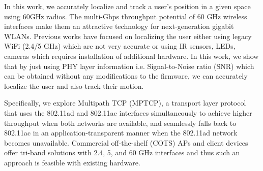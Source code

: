In this work, we accurately localize and track a user's position in 
a given space using 60GHz radios.
The multi-Gbps throughput potential of 60 GHz wireless interfaces make them an 
attractive technology for next-generation gigabit WLANs.
Previous works have focused on localizing the user either using legacy
WiFi (2.4/5 GHz) which are not very accurate or using IR sensors, LEDs, cameras which requires installation of 
additional hardware.
In this work, we show that by just using PHY layer information i.e. Signal-to-Noise ratio (SNR) which can be
obtained without any modifications to the firmware,
we can accurately localize the user and also track their motion.

Specifically, we explore Multipath TCP (MPTCP), a transport layer
protocol that uses the 802.11ad and 802.11ac interfaces simultaneously
to achieve higher throughput when both networks are available, and
seamlessly falls back to 802.11ac in an application-transparent manner
when the 802.11ad network becomes unavailable. Commercial
off-the-shelf (COTS) APs and client devices offer tri-band solutions
with 2.4, 5, and 60 GHz interfaces and thus such an approach is
feasible with existing hardware.

